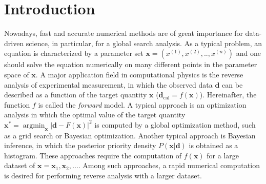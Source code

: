 \documentclass[preprint, 5p, times, sort&compress]{elsarticle}
\begin{document}
        \section{Introduction}
        Nowadays, fast and accurate numerical methods are of great importance for data-driven science, in particular, for a global search analysis. As a typical problem, an equation is characterized by a parameter set $\bm{x}=(x^{(1)},x^{(2)},..,x^{(n)})$ and one should solve the equation numerically on many different points in the parameter space of $\bm{x}$. A major application field in computational physics is the reverse analysis of experimental measurement,
        in which the observed data $\bm{d}$ can be described as a function of the target quantity $\bm{x}$
        ($\bm{d}_\mathrm{cal}=f(\bm{x})$).
        Hereinafter, the function $f$ is called the \emph{forward} model.
        A typical approach is an optimization analysis
        in which the optimal value of the target quantity
        $\bm{x}^* = \operatorname*{argmin}_{\bm{x}} | \bm{d} - F(\bm{x}) |^2$ is computed by a global optimization method,
        such as a grid search or Bayesian optimization.
        Another typical approach is Bayesian inference, in which
        the posterior priority density $P(\bm{x}|\bm{d})$ is obtained as a histogram.
        These approaches require the computation of $f(\bm{x})$
        for a large dataset of $\bm{x}=\bm{x}_1, \bm{x}_2, \ldots$.
        Among such approaches,
        a rapid numerical computation is desired for performing
        reverse analysis with a larger dataset.
\end{document}
